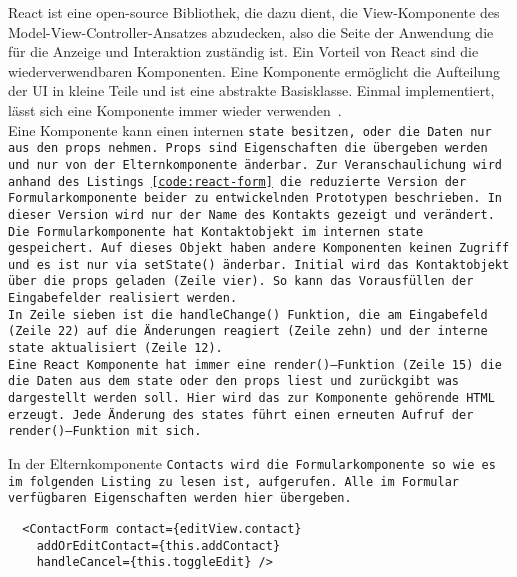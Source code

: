 React ist eine open-source Bibliothek, die dazu dient, die View-Komponente des Model-View-Controller-Ansatzes abzudecken, also die Seite der Anwendung die für die Anzeige und Interaktion zuständig ist. Ein Vorteil von React sind die wiederverwendbaren Komponenten. Eine Komponente ermöglicht die Aufteilung der \gls{UI} in kleine Teile und ist eine abstrakte Basisklasse. Einmal implementiert, lässt sich eine Komponente immer wieder verwenden~\cite{react}.\\
Eine Komponente kann einen internen \tt{state} besitzen, oder die Daten nur aus den \tt{props} nehmen. \tt{Props} sind Eigenschaften die übergeben werden und nur von der Elternkomponente änderbar.
Zur Veranschaulichung wird anhand des Listings \ref{code:react-form} die reduzierte Version der Formularkomponente beider zu entwickelnden Prototypen beschrieben. In dieser Version wird nur der Name des Kontakts gezeigt und verändert.\\
Die Formularkomponente hat Kontaktobjekt im internen \tt{state} gespeichert. Auf dieses Objekt haben andere Komponenten keinen Zugriff und es ist nur via \tt{setState()} änderbar.
Initial wird das Kontaktobjekt über die \tt{props} geladen (Zeile vier). So kann das Vorausfüllen der Eingabefelder realisiert werden.\\
In Zeile sieben ist die \tt{handleChange()} Funktion, die am Eingabefeld (Zeile 22) auf die Änderungen reagiert (Zeile zehn) und der interne \tt{state} aktualisiert (Zeile 12).\\
Eine React Komponente hat immer eine \tt{render()}--Funktion (Zeile 15) die die Daten aus dem \tt{state} oder den \tt{props} liest und zurückgibt was dargestellt werden soll. Hier wird das zur Komponente gehörende \gls{HTML} erzeugt. Jede Änderung des \tt{states} führt einen erneuten Aufruf der \tt{render()}--Funktion mit sich.
\begin{center}
  
\end{center}
%
In der Elternkomponente \tt{Contacts} wird die Formularkomponente so wie es im folgenden Listing zu lesen ist, aufgerufen. Alle im Formular verfügbaren Eigenschaften werden hier übergeben.
\begin{lstlisting}
  <ContactForm contact={editView.contact}
    addOrEditContact={this.addContact}
    handleCancel={this.toggleEdit} />
\end{lstlisting}
